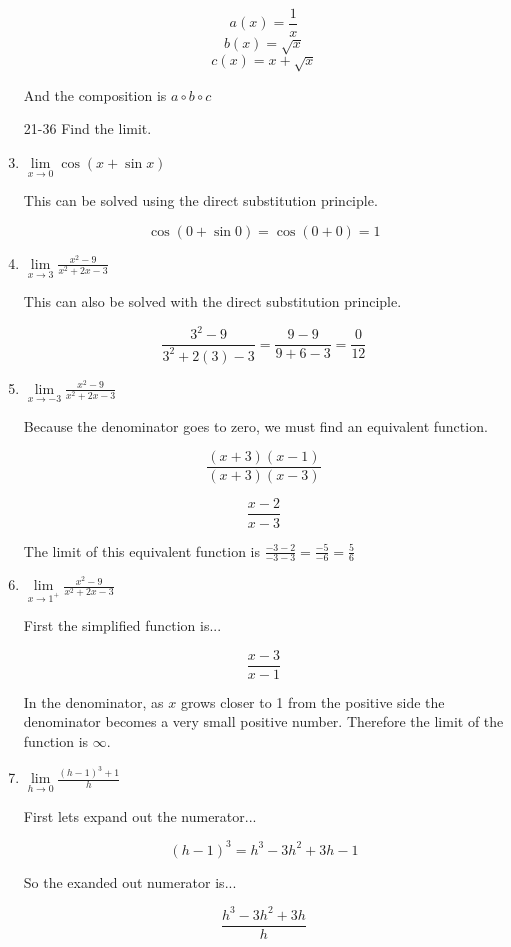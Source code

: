 \documentclass{article}
\begin{document}
\begin{enumerate}
			$$a(x) = \frac{1}{x}$$
			$$b(x) = \sqrt{x}$$
			$$c(x) = x + \sqrt{x}$$

			And the composition is $a \circ b \circ c$



		\item[21-36] Find the limit.

		\item $\lim \limits _{x \to 0} \cos(x + \sin x)$

			This can be solved using the direct substitution principle.

			$$\cos(0 + \sin 0) = \cos(0 + 0) = 1$$

		\item $\lim \limits _{x \to 3} \frac{x^2 - 9}{x^2 + 2x - 3}$

			This can also be solved with the direct substitution principle.

			$$\frac{3^2 - 9}{3^2 + 2(3) - 3} = \frac{9 - 9}{9 + 6 - 3} = \frac{0}{12}$$

		\item $\lim \limits _{x \to -3} \frac{x^2 - 9}{x^2 + 2x - 3}$

			Because the denominator goes to zero, we must find an equivalent function.

			$$\frac{(x+3)(x-1)}{(x+3)(x-3)}$$

			$$\frac{x-2}{x-3}$$

			The limit of this equivalent function is $\frac{-3-2}{-3-3} = \frac{-5}{-6} = \frac{5}{6}$

		\item $\lim \limits _{x \to 1^{+}} \frac{x^2 - 9}{x^2 + 2x - 3}$

			First the simplified function is...

			$$\frac{x-3}{x-1}$$

			In the denominator, as $x$ grows closer to 1 from the positive side
			the denominator becomes a very small positive number. Therefore
			the limit of the function is $\infty$.

		\item $\lim \limits _{h \to 0} \frac{(h-1)^3 + 1}{h}$

			First lets expand out the numerator...

			$$(h-1)^3 = h^3 - 3h^2 +3h - 1$$

			So the exanded out numerator is...

			$$\frac{h^3 - 3h^2 + 3h}{h}$$


\end{enumerate}
\end{document}
